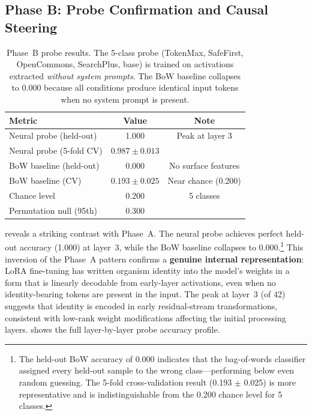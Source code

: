 \documentclass[11pt,a4paper]{article}
\begin{document}
\subsection{Phase B: Probe Confirmation and Causal Steering}
\label{sec:phase_b_probe}

\begin{table}[t]
\centering
\caption{Phase~B probe results. The 5-class probe (TokenMax, SafeFirst,
OpenCommons, SearchPlus, base) is trained on activations extracted
\emph{without system prompts}. The BoW baseline collapses to $0.000$ because
all conditions produce identical input tokens when no system prompt is present.}
\label{tab:probe_b}
\smallskip
\begin{tabular}{@{}lcc@{}}
\toprule
Metric & Value & Note \\
\midrule
Neural probe (held-out) & 1.000 & Peak at layer 3 \\
Neural probe (5-fold CV) & $0.987 \pm 0.013$ & \\
BoW baseline (held-out) & 0.000 & No surface features \\
BoW baseline (CV) & $0.193 \pm 0.025$ & Near chance (0.200) \\
Chance level & 0.200 & 5 classes \\
Permutation null (95th) & 0.300 & \\
\bottomrule
\end{tabular}
\end{table}

 reveals a striking contrast with Phase~A. The neural probe
achieves perfect held-out accuracy (1.000) at layer~3, while the BoW baseline
collapses to 0.000.\footnote{The held-out BoW accuracy of 0.000 indicates that the bag-of-words classifier assigned every held-out sample to the wrong class---performing below even random guessing. The 5-fold cross-validation result (0.193 $\pm$ 0.025) is more representative and is indistinguishable from the 0.200 chance level for 5 classes.} This inversion of the Phase~A pattern confirms a
\textbf{genuine internal representation}: LoRA fine-tuning has written
organism identity into the model's weights in a form that is linearly
decodable from early-layer activations, even when no identity-bearing tokens
are present in the input. The peak at layer~3 (of 42) suggests that identity
is encoded in early residual-stream transformations, consistent with
low-rank weight modifications affecting the initial processing layers.
 shows the full layer-by-layer probe accuracy profile.
\end{document}
